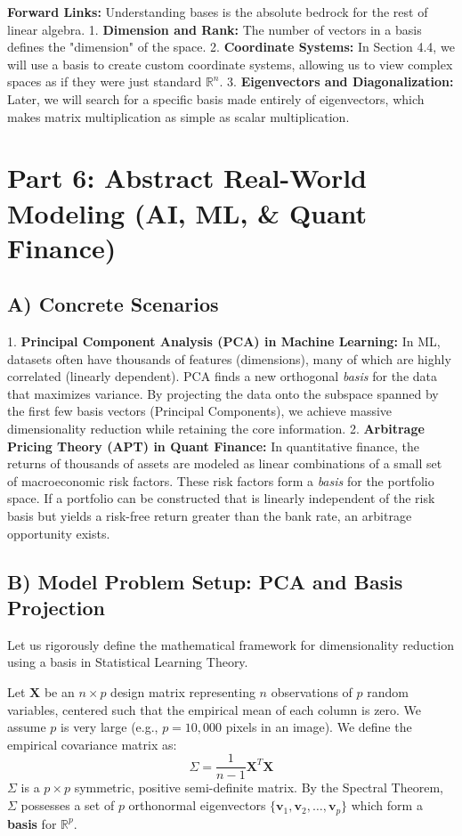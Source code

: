 \documentclass[12pt]{article}
\begin{document}
\textbf{Forward Links:} Understanding bases is the absolute bedrock for the rest of linear algebra. 
1. \textbf{Dimension and Rank:} The number of vectors in a basis defines the "dimension" of the space.
2. \textbf{Coordinate Systems:} In Section 4.4, we will use a basis to create custom coordinate systems, allowing us to view complex spaces as if they were just standard $\mathbb{R}^n$.
3. \textbf{Eigenvectors and Diagonalization:} Later, we will search for a specific basis made entirely of eigenvectors, which makes matrix multiplication as simple as scalar multiplication.

\newpage
\section{Part 6: Abstract Real-World Modeling (AI, ML, \& Quant Finance)}

\subsection{A) Concrete Scenarios}
1. \textbf{Principal Component Analysis (PCA) in Machine Learning:} In ML, datasets often have thousands of features (dimensions), many of which are highly correlated (linearly dependent). PCA finds a new orthogonal \textit{basis} for the data that maximizes variance. By projecting the data onto the subspace spanned by the first few basis vectors (Principal Components), we achieve massive dimensionality reduction while retaining the core information.
2. \textbf{Arbitrage Pricing Theory (APT) in Quant Finance:} In quantitative finance, the returns of thousands of assets are modeled as linear combinations of a small set of macroeconomic risk factors. These risk factors form a \textit{basis} for the portfolio space. If a portfolio can be constructed that is linearly independent of the risk basis but yields a risk-free return greater than the bank rate, an arbitrage opportunity exists.

\subsection{B) Model Problem Setup: PCA and Basis Projection}
Let us rigorously define the mathematical framework for dimensionality reduction using a basis in Statistical Learning Theory.

Let $\mathbf{X}$ be an $n \times p$ design matrix representing $n$ observations of $p$ random variables, centered such that the empirical mean of each column is zero. We assume $p$ is very large (e.g., $p = 10,000$ pixels in an image).
We define the empirical covariance matrix as:
\[ \Sigma = \frac{1}{n-1} \mathbf{X}^T \mathbf{X} \]
$\Sigma$ is a $p \times p$ symmetric, positive semi-definite matrix. By the Spectral Theorem, $\Sigma$ possesses a set of $p$ orthonormal eigenvectors $\{\mathbf{v}_1, \mathbf{v}_2, \dots, \mathbf{v}_p\}$ which form a \textbf{basis} for $\mathbb{R}^p$.
\end{document}
